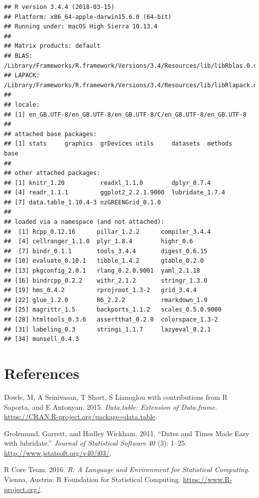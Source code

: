 \documentclass[]{article}
\begin{document}
\begin{verbatim}
## R version 3.4.4 (2018-03-15)
## Platform: x86_64-apple-darwin15.6.0 (64-bit)
## Running under: macOS High Sierra 10.13.4
## 
## Matrix products: default
## BLAS: /Library/Frameworks/R.framework/Versions/3.4/Resources/lib/libRblas.0.dylib
## LAPACK: /Library/Frameworks/R.framework/Versions/3.4/Resources/lib/libRlapack.dylib
## 
## locale:
## [1] en_GB.UTF-8/en_GB.UTF-8/en_GB.UTF-8/C/en_GB.UTF-8/en_GB.UTF-8
## 
## attached base packages:
## [1] stats     graphics  grDevices utils     datasets  methods   base     
## 
## other attached packages:
## [1] knitr_1.20          readxl_1.1.0        dplyr_0.7.4        
## [4] readr_1.1.1         ggplot2_2.2.1.9000  lubridate_1.7.4    
## [7] data.table_1.10.4-3 nzGREENGrid_0.1.0  
## 
## loaded via a namespace (and not attached):
##  [1] Rcpp_0.12.16      pillar_1.2.2      compiler_3.4.4   
##  [4] cellranger_1.1.0  plyr_1.8.4        highr_0.6        
##  [7] bindr_0.1.1       tools_3.4.4       digest_0.6.15    
## [10] evaluate_0.10.1   tibble_1.4.2      gtable_0.2.0     
## [13] pkgconfig_2.0.1   rlang_0.2.0.9001  yaml_2.1.18      
## [16] bindrcpp_0.2.2    withr_2.1.2       stringr_1.3.0    
## [19] hms_0.4.2         rprojroot_1.3-2   grid_3.4.4       
## [22] glue_1.2.0        R6_2.2.2          rmarkdown_1.9    
## [25] magrittr_1.5      backports_1.1.2   scales_0.5.0.9000
## [28] htmltools_0.3.6   assertthat_0.2.0  colorspace_1.3-2 
## [31] labeling_0.3      stringi_1.1.7     lazyeval_0.2.1   
## [34] munsell_0.4.3
\end{verbatim}

\section*{References}\label{references}

\hypertarget{refs}{}
\hypertarget{ref-data.table}{}
Dowle, M, A Srinivasan, T Short, S Lianoglou with contributions from R
Saporta, and E Antonyan. 2015. \emph{Data.table: Extension of
Data.frame}. \url{https://CRAN.R-project.org/package=data.table}.

\hypertarget{ref-lubridate}{}
Grolemund, Garrett, and Hadley Wickham. 2011. ``Dates and Times Made
Easy with lubridate.'' \emph{Journal of Statistical Software} 40 (3):
1--25. \url{http://www.jstatsoft.org/v40/i03/}.

\hypertarget{ref-baseR}{}
R Core Team. 2016. \emph{R: A Language and Environment for Statistical
Computing}. Vienna, Austria: R Foundation for Statistical Computing.
\url{https://www.R-project.org/}.
\end{document}
